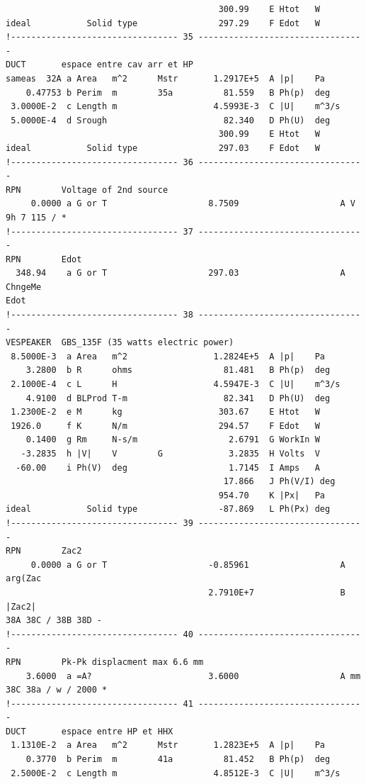 \begin{linenumbers}
\begin{verbatim}
                                          300.99    E Htot   W
ideal           Solid type                297.29    F Edot   W
!--------------------------------- 35 ---------------------------------
DUCT       espace entre cav arr et HP
sameas  32A a Area   m^2      Mstr       1.2917E+5  A |p|    Pa
    0.47753 b Perim  m        35a          81.559   B Ph(p)  deg
 3.0000E-2  c Length m                   4.5993E-3  C |U|    m^3/s
 5.0000E-4  d Srough                       82.340   D Ph(U)  deg
                                          300.99    E Htot   W
ideal           Solid type                297.03    F Edot   W
!--------------------------------- 36 ---------------------------------
RPN        Voltage of 2nd source
     0.0000 a G or T                    8.7509                    A V
9h 7 115 / *
!--------------------------------- 37 ---------------------------------
RPN        Edot
  348.94    a G or T                    297.03                    A ChngeMe
Edot
!--------------------------------- 38 ---------------------------------
VESPEAKER  GBS_135F (35 watts electric power)
 8.5000E-3  a Area   m^2                 1.2824E+5  A |p|    Pa
    3.2800  b R      ohms                  81.481   B Ph(p)  deg
 2.1000E-4  c L      H                   4.5947E-3  C |U|    m^3/s
    4.9100  d BLProd T-m                   82.341   D Ph(U)  deg
 1.2300E-2  e M      kg                   303.67    E Htot   W
 1926.0     f K      N/m                  294.57    F Edot   W
    0.1400  g Rm     N-s/m                  2.6791  G WorkIn W
   -3.2835  h |V|    V        G             3.2835  H Volts  V
  -60.00    i Ph(V)  deg                    1.7145  I Amps   A
                                           17.866   J Ph(V/I) deg
                                          954.70    K |Px|   Pa
ideal           Solid type                -87.869   L Ph(Px) deg
!--------------------------------- 39 ---------------------------------
RPN        Zac2
     0.0000 a G or T                    -0.85961                  A arg(Zac
                                        2.7910E+7                 B |Zac2|
38A 38C / 38B 38D -
!--------------------------------- 40 ---------------------------------
RPN        Pk-Pk displacment max 6.6 mm
    3.6000  a =A?                       3.6000                    A mm
38C 38a / w / 2000 *
!--------------------------------- 41 ---------------------------------
DUCT       espace entre HP et HHX
 1.1310E-2  a Area   m^2      Mstr       1.2823E+5  A |p|    Pa
    0.3770  b Perim  m        41a          81.452   B Ph(p)  deg
 2.5000E-2  c Length m                   4.8512E-3  C |U|    m^3/s

\end{verbatim}
\end{linenumbers}
